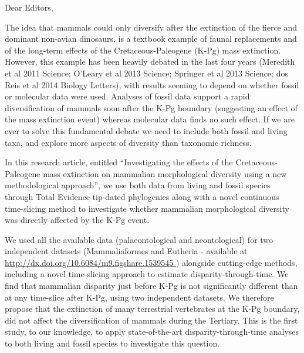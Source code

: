 \documentclass[11pt]{letter}
\begin{document}
\begin{letter}{}
\opening{Dear Editors,}

The idea that mammals could only diversify after the extinction of the fierce and dominant non-avian dinosaurs, is a textbook example of faunal replacements and of the long-term effects of the Cretaceous-Paleogene (K-Pg) mass extinction.
However, this example has been heavily debated in the last four years (Meredith et al 2011 Science; O'Leary et al 2013 Science; Springer et al 2013 Science; dos Reis et al 2014 Biology Letters), with results seeming to depend on whether fossil or molecular data were used.
Analyses of fossil data support a rapid diversification of mammals soon after the K-Pg boundary (suggesting an effect of the mass extinction event) whereas molecular data finds no such effect.
If we are ever to solve this fundamental debate we need to include both fossil and living taxa, and explore more aspects of diversity than taxonomic richness.

In this research article, entitled ``Investigating the effects of the Cretaceous-Paleogene mass extinction on mammalian morphological diversity using a new methodological approach'', we use both data from living and fossil species through Total Evidence tip-dated phylogenies along with a novel continuous time-slicing method to investigate whether mammalian morphological diversity was directly affected by the K-Pg event.

We used all the available data (palaeontological and neontological) for two independent datasets (Mammaliaformes and Eutheria - available at \url{http://dx.doi.org/10.6084/m9.figshare.1539545
}) alongside cutting-edge methods, including a novel time-slicing approach to estimate disparity-through-time.
We find that mammalian disparity just before K-Pg is not significantly different than at any time-slice after K-Pg, using two independent datasets.
We therefore propose that the extinction of many terrestrial vertebrates at the K-Pg boundary, did not affect the diversification of mammals during the Tertiary. 
This is the first study, to our knowledge, to apply state-of-the-art disparity-through-time analyses to both living and fossil species to investigate this question.


\end{letter}
\end{document}
